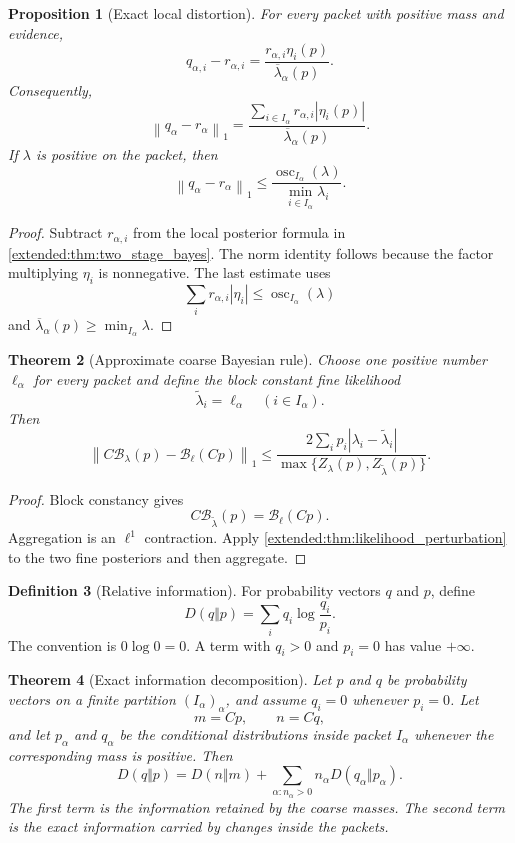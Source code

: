 \documentclass[11pt,a4paper]{article}
\newtheorem{theorem}{Theorem}[section]
\newtheorem{proposition}[theorem]{Proposition}
\theoremstyle{definition}
\newtheorem{definition}[theorem]{Definition}
\theoremstyle{remark}
\newcommand{\norm}[1]{\left\lVert#1\right\rVert}
\newcommand{\Bcal}{\mathcal B}
\newcommand{\osc}{\operatorname{osc}}
\newcommand{\abs}[1]{\left\lvert#1\right\rvert}
\begin{document}
\begin{proposition}[Exact local distortion]\label{extended:record:053}\label{extended:prop:local_bayes_distortion}
For every packet with positive mass and evidence,
\[
q_{\alpha,i}-r_{\alpha,i}
=
\frac{r_{\alpha,i}\eta_i(p)}
{\overline\lambda_\alpha(p)}.
\]
Consequently,
\[
\norm{q_\alpha-r_\alpha}_1
=
\frac{
\sum_{i\in I_\alpha}r_{\alpha,i}\abs{\eta_i(p)}
}{\overline\lambda_\alpha(p)}.
\]
If \(\lambda\) is positive on the packet, then
\[
\norm{q_\alpha-r_\alpha}_1
\leq
\frac{\osc_{I_\alpha}(\lambda)}
{\min_{i\in I_\alpha}\lambda_i}.
\]
\end{proposition}

\begin{proof}
Subtract \(r_{\alpha,i}\) from the local posterior formula in \cref{extended:thm:two_stage_bayes}. The norm identity follows because the factor multiplying \(\eta_i\) is nonnegative. The last estimate uses
\[
\sum_i r_{\alpha,i}\abs{\eta_i}
\leq
\osc_{I_\alpha}(\lambda)
\]
and \(\overline\lambda_\alpha(p)\geq\min_{I_\alpha}\lambda\).
\end{proof}

\begin{theorem}[Approximate coarse Bayesian rule]\label{extended:record:054}\label{extended:thm:approximate_coarse_bayes}
Choose one positive number \(\ell_\alpha\) for every packet and define the block constant fine likelihood
\[
\widetilde\lambda_i=\ell_\alpha
\quad(i\in I_\alpha).
\]
Then
\[
\norm{
C\Bcal_\lambda(p)-\Bcal_\ell(Cp)
}_1
\leq
\frac{
2\sum_i p_i\abs{\lambda_i-\widetilde\lambda_i}
}{
\max\{Z_\lambda(p),Z_{\widetilde\lambda}(p)\}
}.
\]
\end{theorem}

\begin{proof}
Block constancy gives
\[
C\Bcal_{\widetilde\lambda}(p)
=
\Bcal_\ell(Cp).
\]
Aggregation is an \(\ell^1\) contraction. Apply \cref{extended:thm:likelihood_perturbation} to the two fine posteriors and then aggregate.
\end{proof}

\begin{definition}[Relative information]\label{extended:record:055}
For probability vectors \(q\) and \(p\), define
\[
D(q\Vert p)
=
\sum_iq_i\log\frac{q_i}{p_i}.
\]
The convention is \(0\log0=0\). A term with \(q_i>0\) and \(p_i=0\) has value \(+\infty\).
\end{definition}

\begin{theorem}[Exact information decomposition]\label{extended:record:056}\label{extended:thm:bayesian_information_chain}
Let \(p\) and \(q\) be probability vectors on a finite partition \((I_\alpha)_\alpha\), and assume \(q_i=0\) whenever \(p_i=0\). Let
\[
m=Cp,
\qquad
n=Cq,
\]
and let \(p_\alpha\) and \(q_\alpha\) be the conditional distributions inside packet \(I_\alpha\) whenever the corresponding mass is positive. Then
\[
D(q\Vert p)
=
D(n\Vert m)
+
\sum_{\alpha:n_\alpha>0}
 n_\alpha D(q_\alpha\Vert p_\alpha).
\]
The first term is the information retained by the coarse masses. The second term is the exact information carried by changes inside the packets.
\end{theorem}
\end{document}
